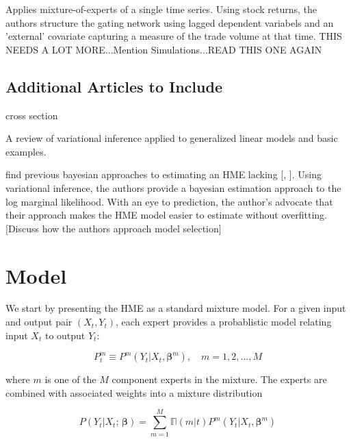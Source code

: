 \documentclass[12pt]{article}
\newcommand{\expmixwt}[0]{\mathbb{\Pi}}
\begin{document}
\cite{CarvalhoSkoulakis2010} Applies mixture-of-experts of a single time series.
Using stock returns, the authors structure the gating network using lagged
dependent variabels and an 'external' covariate capturing a measure of the
trade volume at that time. THIS NEEDS A LOT MORE...Mention Simulations...READ 
THIS ONE AGAIN




\subsection{Additional Articles to Include}


\cite{JeffriesPfeiffer2001} cross section

\cite{BleiKucukelbirMcAuliffe2006} A review of variational inference applied
to generalized linear models and basic examples.

\cite{UedaGhahramani2002}

\cite{BishopSvenson2003} find previous bayesian approaches to estimating an HME
lacking [\cite{HuertaJiangTanner2003}, \cite{UedaGhahramani2002}]. Using
variational inference, the authors provide a bayesian estimation approach
to the log marginal likelihood. With an eye to prediction, the author's advocate
that their approach makes the HME model easier to estimate without overfitting.
[Discuss how the authors approach model selection]


\cite{CarvalhoSkoulakis2005}

\bigskip


\section{Model} \label{sec:Model}

We start by presenting the HME as a standard mixture model.
For a given input and output pair $(X_{t}, Y_{t})$, each expert
provides a probablistic model relating input $X_{t}$ to output
$Y_{t}$:

\begin{equation} \label{eq:ConditionalDistribution}
  P^{m}_{t} \equiv P^{m}(Y_{t}|X_{t}, \boldsymbol{\beta}^{m}), \quad m = 1,2,...,M
\end{equation}

where $m$ is one of the $M$ component experts in the mixture. The experts
are combined with associated weights into a mixture distribution

\begin{equation} \label{eq:staticmixture}
  P(Y_{t} | X_{t}; \, \boldsymbol{\beta}) = \sum_{m=1}^{M} \expmixwt(m|t) P^{m}(Y_{t} | X_{t}, \boldsymbol{\beta}^{m})
\end{equation}
\end{document}
